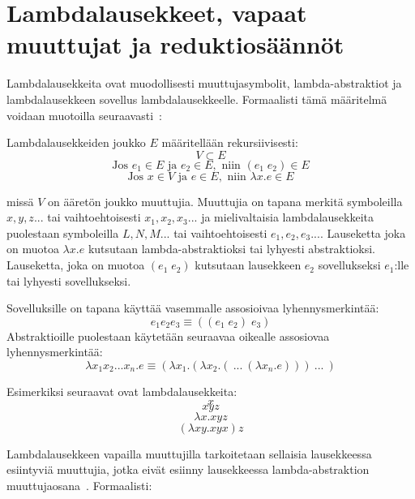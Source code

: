 \section{Lambdalausekkeet, vapaat muuttujat ja reduktiosäännöt}

Lambdalausekkeita ovat muodollisesti muuttujasymbolit, lambda-abstraktiot ja lambdalausekkeen sovellus lambdalausekkeelle. Formaalisti tämä määritelmä voidaan muotoilla seuraavasti~\cite[s.~8]{Hudak89}:

\begin{maar}[lambdalausekkeet]
Lambdalausekkeiden joukko $E$ määritellään rekursiivisesti: 
\[ V \subset E \]
\[ \text{Jos } e_{1} \in E \text{ ja } e_{2} \in E, \text{ niin }  (e_{1} \; e_{2}) \in E \]
\[ \text{Jos } x \in V \text{ ja } e \in E, \text{ niin } \lambda x.e \in E \]

missä $V$ on ääretön joukko muuttujia. Muuttujia on tapana merkitä symboleilla $x, y,z...$ tai vaihtoehtoisesti $x_{1}, x_{2}, x_{3}...$ ja mielivaltaisia lambdalausekkeita puolestaan symboleilla $L, N, M ...$ tai vaihtoehtoisesti $e_{1}, e_{2}, e_{3}...$.  Lauseketta joka on muotoa $\lambda x.e$ kutsutaan lambda-abstraktioksi tai lyhyesti abstraktioksi. Lauseketta, joka on muotoa $(e_{1} \; e_{2})$ kutsutaan lausekkeen $e_{2}$ sovellukseksi $e_{1}$:lle tai lyhyesti sovellukseksi.
\end{maar}

Sovelluksille on tapana käyttää vasemmalle assosioivaa lyhennysmerkintää: 
\[e_{1} e_{2} e_{3} \equiv ((e_{1} \; e_{2}) \; e_{3})\]
Abstraktioille puolestaan käytetään seuraavaa oikealle assosiovaa lyhennysmerkintää: 
\[ \lambda x_{1}x_{2}...x_{n}.e \equiv (\lambda x_{1} . ( \lambda x_{2} . ( \: ... \: ( \lambda x_{n} . e ))) \: ... \: ) \]

\par
Esimerkiksi seuraavat ovat lambdalausekkeita:
\pagebreak
\[ x \]
\[ xyz \]
\[ \lambda x . xyz \]
\[ (\lambda xy . xyx) z \]


Lambdalausekkeen vapailla muuttujilla tarkoitetaan sellaisia lausekkeessa esiintyviä muuttujia, jotka eivät esiinny lausekkeessa lambda-abstraktion muuttujaosana~\cite[s.~8]{Hudak89}. Formaalisti: 

